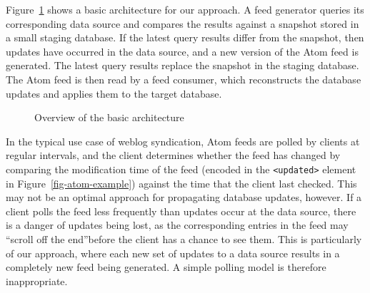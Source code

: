 \documentclass{CRPITStyle}
\begin{document}
Figure~\ref{fig-basic} shows a basic architecture for our approach. A
feed generator queries its corresponding data source and compares the
results against a snapshot stored in a small staging database. If the
latest query results differ from the snapshot, then updates have
occurred in the data source, and a new version of the Atom feed is
generated. The latest query results replace the snapshot in the staging
database. The Atom feed is then read by a feed consumer, which
reconstructs the database updates and applies them to the target
database.


\begin{figure}[htb]
	\caption{Overview of the basic architecture}
	\label{fig-basic}
\end{figure}


In the typical use case of weblog syndication, Atom feeds are polled by
clients at regular intervals, and the client determines whether the feed
has changed by comparing the modification time of the feed (encoded in
the \verb|<updated>| element in Figure~\ref{fig-atom-example}) against
the time that the client last checked. This may not be an optimal
approach for propagating database updates, however. If a client polls
the feed less frequently than updates occur at the data source, there is
a danger of updates being lost, as the corresponding entries in the feed
may ``scroll off the end''before the client has a chance to see them.
This is particularly of our approach, where each new set of updates to a
data source results in a completely new feed being generated. A simple
polling model is therefore inappropriate.
\end{document}
